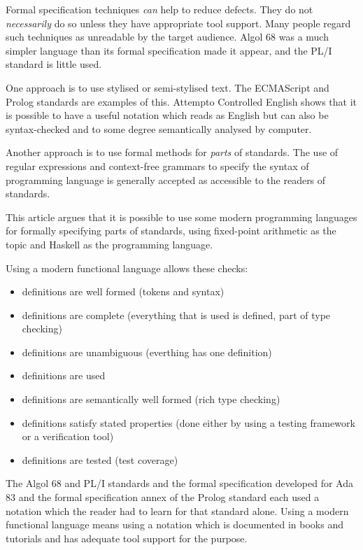 \documentclass{article}
\begin{document}
Formal specification techniques {\em can} help to reduce defects.
They do not {\em necessarily} do so unless they have appropriate
tool support.  Many people regard such techniques as unreadable
by the target audience.  Algol 68 was a much simpler language than
its formal specification made it appear, and the PL/I standard
is little used.

One approach is to use stylised or semi-stylised text.
The ECMAScript and Prolog standards are examples of this.
Attempto Controlled English shows that it is possible to
have a useful notation which reads as English but can also
be syntax-checked and to some degree semantically analysed by
computer.

Another approach is to use formal methods for {\it parts} of
standards.  The use of regular expressions and context-free
grammars to specify the syntax of programming language is
generally accepted as accessible to the readers of standards.

This article argues that it is possible to use some modern
programming languages for formally specifying parts of standards,
using fixed-point arithmetic as the topic and Haskell as the
programming language.

Using a modern functional language allows these checks:
\begin{itemize}
\item definitions are well formed (tokens and syntax)
\item definitions are complete (everything that is used
is defined, part of type checking)
\item definitions are unambiguous (everthing has one definition)
\item definitions are used
\item definitions are semantically well formed (rich type checking)
\item definitions satisfy stated properties (done either by using
a testing framework or a verification tool)
\item definitions are tested (test coverage)
\end{itemize}

The Algol 68 and PL/I standards and the formal specification
developed for Ada 83 and the formal specification annex of the
Prolog standard each used a notation which the reader had to
learn for that standard alone.  Using a modern functional language
means using a notation which is documented in books and tutorials
and has adequate tool support for the purpose.
\end{document}
